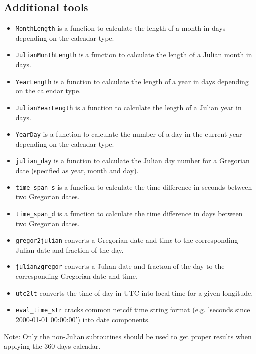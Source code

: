 \documentclass[twoside]{article}
\begin{document}
\subsection{Additional tools}
%
\begin{itemize}
\item \verb|MonthLength| is a function to calculate the length of a month in
      days depending on the calendar type.
\item \verb|JulianMonthLength| is a function to calculate the length of a
      Julian month in days.
\item \verb|YearLength| is a function to calculate the length of a year in
      days depending on the calendar type.
\item \verb|JulianYearLength| is a function to calculate the length of a
      Julian year in days.
\item \verb|YearDay| is a function to calculate the number of a day in the
      current year depending on the calendar type.
\item \verb|julian_day| is a function to calculate the Julian day number
      for a Gregorian date (specified as year, month and day).
\item \verb|time_span_s| is a function to calculate the time difference in
      seconds between two Gregorian dates.
\item \verb|time_span_d| is a function to calculate the time difference in
      days between two Gregorian dates.
\item \verb|gregor2julian| converts a Gregorian date and time to the
      corresponding Julian date and fraction of the day.
\item \verb|julian2gregor| converts a Julian date and fraction of the day to
      the corresponding Gregorian date and time.
\item \verb|utc2lt| converts the time of day in UTC into local time for a
      given longitude.
\item \verb|eval_time_str| cracks common netcdf time string format (e.g.
           'seconds since 2000-01-01 00:00:00')  into date components.
\end{itemize}

Note: Only the non-Julian subroutines should be used to get proper
  results when applying the 360-days calendar.

\end{document}
